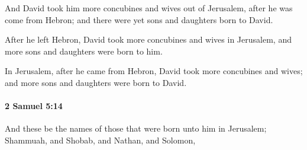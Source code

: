 			\begin{versebox}
					\item[BHS] 
					\item[ASV] And David took him more concubines and wives out of Jerusalem, after he was come from Hebron; and there were yet sons and daughters born to David.
					\item[NIV] After he left Hebron, David took more concubines and wives in Jerusalem, and more sons and daughters were born to him.
					\item[NRSV] In Jerusalem, after he came from Hebron, David took more concubines and wives; and more sons and daughters were born to David.
			\end{versebox}

		\paragraph{2 Samuel 5:14} %
			\label{2SAMUEL-5-14}

			And these be the names of those that were born unto him in Jerusalem; Shammuah, and Shobab, and Nathan, and Solomon,

